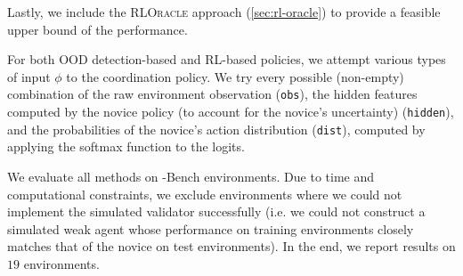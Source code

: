 
Lastly, we include the \textsc{RLOracle} approach (\autoref{sec:rl-oracle}) to provide a feasible upper bound of the performance. 


For both OOD detection-based and RL-based policies, we attempt various types of input $\phi$ to the coordination policy. 
We try every possible (non-empty) combination of the raw environment 
 observation (\texttt{obs}), the hidden features computed by the novice policy (to account for the novice's uncertainty) (\texttt{hidden}), and the probabilities of the novice's action distribution (\texttt{dist}), computed by applying the softmax function to the logits.

We evaluate all methods on \ourMethod-Bench environments. Due to time and computational constraints, we exclude environments where we could not implement the simulated validator successfully (i.e. we could not construct a simulated weak agent whose performance on training environments closely matches that of the novice on test environments). 
In the end, we report results on $19$ environments. 



